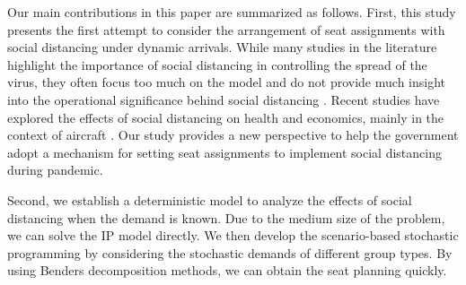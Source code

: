 



Our main contributions in this paper are summarized as follows. First, this study presents the first attempt to consider the arrangement of seat assignments with social distancing under dynamic arrivals. While many studies in the literature highlight the importance of social distancing in controlling the spread of the virus, they often focus too much on the model and do not provide much insight into the operational significance behind social distancing \cite{barry2021optimal, fischetti2021safe}. Recent studies have explored the effects of social distancing on health and economics, mainly in the context of aircraft \cite{salari2020social, ghorbani2020model, salari2022social}. Our study provides a new perspective to help the government adopt a mechanism for setting seat assignments to implement social distancing during pandemic.

Second, we establish a deterministic model to analyze the effects of social distancing when the demand is known. Due to the medium size of the problem, we can solve the IP model directly. We then develop the scenario-based stochastic programming by considering the stochastic demands of different group types. By using Benders decomposition methods, we can obtain the seat planning quickly. 

